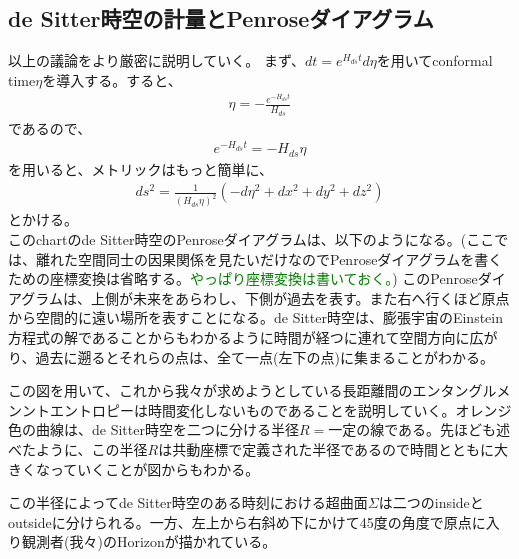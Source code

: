 \subsection{de Sitter時空の計量とPenroseダイアグラム}
以上の議論をより厳密に説明していく。
まず、$dt=e^{H_{ds}t}d\eta$を用いてconformal time$\eta$を導入する。すると、
\begin{align}
\eta=-\frac{e^{-H_{ds}t}}{H_{ds}}
\end{align}
であるので、
\begin{align}
e^{-H_{ds}t}=-H_{ds}\eta
\end{align}
を用いると、メトリックはもっと簡単に、
\begin{align}
ds^2=\frac{1}{(H_{ds}\eta)^2}(-d\eta^2+dx^2+dy^2+dz^2)
\end{align}
とかける。
\\

このchartのde Sitter時空のPenroseダイアグラムは、以下のようになる。(ここでは、離れた空間同士の因果関係を見たいだけなのでPenroseダイアグラムを書くための座標変換は省略する。\textcolor{green}{やっぱり座標変換は書いておく。})
このPenroseダイアグラムは、上側が未来をあらわし、下側が過去を表す。また右へ行くほど原点から空間的に遠い場所を表すことになる。de Sitter時空は、膨張宇宙のEinstein方程式の解であることからもわかるように時間が経つに連れて空間方向に広がり、過去に遡るとそれらの点は、全て一点(左下の点)に集まることがわかる。

この図を用いて、これから我々が求めようとしている長距離間のエンタングルメンントエントロピーは時間変化しないものであることを説明していく。オレンジ色の曲線は、de Sitter時空を二つに分ける半径$R=$一定の線である。先ほども述べたように、この半径$R$は共動座標で定義された半径であるので時間とともに大きくなっていくことが図からもわかる。

この半径によってde Sitter時空のある時刻における超曲面$\Sigma$は二つのinsideとoutsideに分けられる。一方、左上から右斜め下にかけて45度の角度で原点に入り観測者(我々)のHorizonが描かれている。

